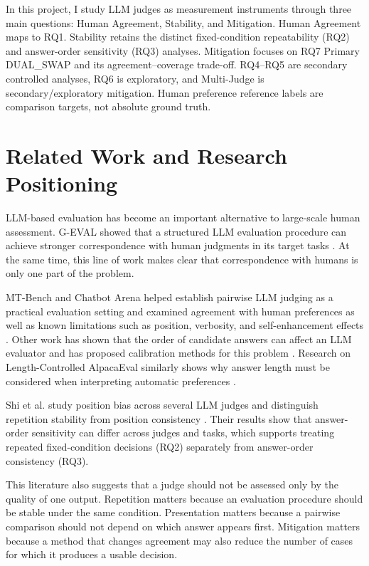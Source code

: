 \documentclass[11pt,a4paper]{article}
\begin{document}
In this project, I study LLM judges as measurement instruments through three main questions: Human Agreement, Stability, and Mitigation. Human Agreement maps to RQ1. Stability retains the distinct fixed-condition repeatability (RQ2) and answer-order sensitivity (RQ3) analyses. Mitigation focuses on RQ7 Primary DUAL\_SWAP and its agreement--coverage trade-off. RQ4--RQ5 are secondary controlled analyses, RQ6 is exploratory, and Multi-Judge is secondary/exploratory mitigation. Human preference reference labels are comparison targets, not absolute ground truth.

\section{Related Work and Research Positioning}

LLM-based evaluation has become an important alternative to large-scale human assessment. G-EVAL showed that a structured LLM evaluation procedure can achieve stronger correspondence with human judgments in its target tasks \citep{liu2023geval}. At the same time, this line of work makes clear that correspondence with humans is only one part of the problem.

MT-Bench and Chatbot Arena helped establish pairwise LLM judging as a practical evaluation setting and examined agreement with human preferences as well as known limitations such as position, verbosity, and self-enhancement effects \citep{zheng2023judging}. Other work has shown that the order of candidate answers can affect an LLM evaluator and has proposed calibration methods for this problem \citep{wang2024fair}. Research on Length-Controlled AlpacaEval similarly shows why answer length must be considered when interpreting automatic preferences \citep{dubois2024length}.

Shi et al. study position bias across several LLM judges and distinguish repetition stability from position consistency \citep{shi2025judging}. Their results show that answer-order sensitivity can differ across judges and tasks, which supports treating repeated fixed-condition decisions (RQ2) separately from answer-order consistency (RQ3).

This literature also suggests that a judge should not be assessed only by the quality of one output. Repetition matters because an evaluation procedure should be stable under the same condition. Presentation matters because a pairwise comparison should not depend on which answer appears first. Mitigation matters because a method that changes agreement may also reduce the number of cases for which it produces a usable decision.
\end{document}
